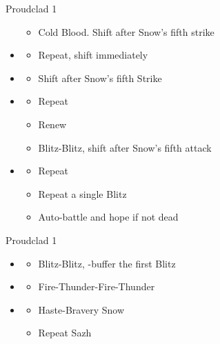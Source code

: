 \begin{paracol}{2}
\begin{battle}{Proudclad 1}
\begin{itemize}
		      \begin{itemize}
			      \item Cold Blood. Shift after Snow's fifth strike
		      \end{itemize}
		\item \fifth
		      \begin{itemize}
			      \item Repeat, shift immediately
		      \end{itemize}
		\item \sixth
		      \begin{itemize}
			      \item Shift after Snow's fifth Strike
		      \end{itemize}
		\item \first
		      \begin{itemize}
			      \item Repeat
			      \item Renew
			      \item Blitz-Blitz, shift after Snow's fifth attack
		      \end{itemize}
		\item \second
		      \begin{itemize}
			      \item Repeat
			      \item Repeat a single Blitz
			      \item Auto-battle and hope if not dead
		      \end{itemize}
	\end{itemize}
\end{battle}
\switchcolumn
\begin{battle}{Proudclad 1}
	\begin{itemize}
		\item \second
		      \begin{itemize}
			      \item Blitz-Blitz, \rav-buffer the first Blitz
		      \end{itemize}
		\item \sixth
		      \begin{itemize}
			      \item Fire-Thunder-Fire-Thunder
		      \end{itemize}
		\item \fourth
		      \begin{itemize}
			      \item Haste-Bravery Snow
			      \item Repeat Sazh

\end{itemize}
\end{itemize}
\end{battle}
\end{paracol}
